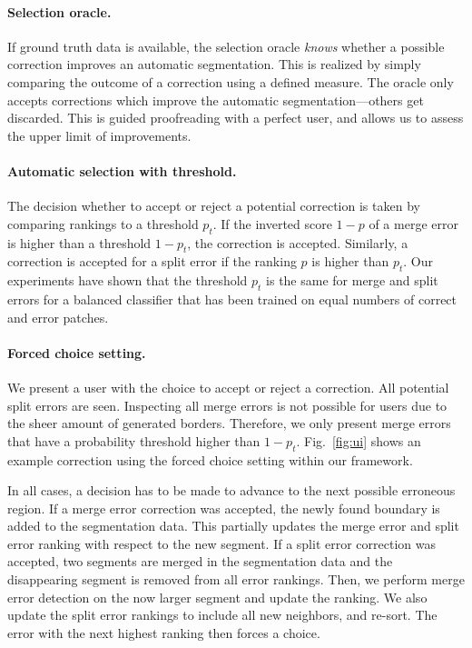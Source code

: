 \paragraph{Selection oracle.} If ground truth data is available, the selection oracle \textit{knows} whether a possible correction improves an automatic segmentation. This is realized by simply comparing the outcome of a correction using a defined measure. The oracle only accepts corrections which improve the automatic segmentation---others get
discarded. This is guided proofreading with a perfect user, and allows us to assess the upper limit of improvements.

\paragraph{Automatic selection with threshold.} The decision whether to accept or reject a potential correction is taken by comparing rankings to a threshold $p_t$. If the inverted score $1-p$ of a merge error is higher than a threshold $1-p_t$, the correction is accepted. Similarly, a correction is accepted for a split error if the ranking $p$ is higher than $p_t$. Our experiments have shown that the threshold $p_t$ is the same for merge and split errors for a balanced classifier that has been trained on equal numbers of correct and error patches.

\paragraph{Forced choice setting.} We present a user with the choice to accept or reject a correction. All potential split errors are seen. Inspecting all merge errors is not possible for users due to the sheer amount of generated borders. Therefore, we only present merge errors that have a probability threshold higher than $1-p_t$. Fig.~\ref{fig:ui} shows an example correction using the forced choice setting within our framework.

\noindent \newline In all cases, a decision has to be made to advance to the next possible erroneous region. If a merge error correction was accepted, the newly found boundary is added to the segmentation data. This partially updates the merge error and split error ranking with respect to the new segment. If a split error correction was accepted, two segments are merged in the segmentation data and the disappearing segment is removed from all error rankings. Then, we perform merge error detection on the now larger segment and update the ranking. We also update the split error rankings to include all new neighbors, and re-sort. The error with the next highest ranking then forces a choice.

